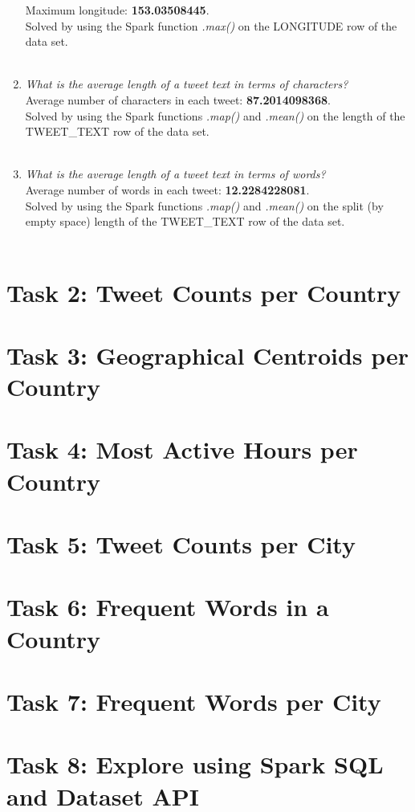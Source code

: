 \documentclass{article}
\begin{document}
\begin{enumerate}[label=\alph*)]
    Maximum longitude: \textbf{153.03508445}.\\
    
    Solved by using the Spark function \textit{.max()} on the LONGITUDE row of the data set.\\ \\
    
    
    \item \textit{ What is the average length of a tweet text in terms of characters?}\\
    
    Average number of characters in each tweet: \textbf{87.2014098368}.\\
    
    Solved by using the Spark functions \textit{.map()} and \textit{.mean()} on the length of the TWEET\_TEXT row of the data set.\\ \\
    
    
    \item \textit{What is the average length of a tweet text in terms of words?}\\
    
    Average number of words in each tweet: \textbf{12.2284228081}.\\
    
    Solved by using the Spark functions \textit{.map()} and \textit{.mean()} on the split (by empty space) length of the TWEET\_TEXT row of the data set.\\ \\
\end{enumerate}


\section*{Task 2: Tweet Counts per Country}

\section*{Task 3: Geographical Centroids per Country}

\section*{Task 4: Most Active Hours per Country}

\section*{Task 5: Tweet Counts per City}

\section*{Task 6: Frequent Words in a Country}

\section*{Task 7: Frequent Words per City}

\section*{Task 8: Explore using Spark SQL and Dataset API}
\end{document}
